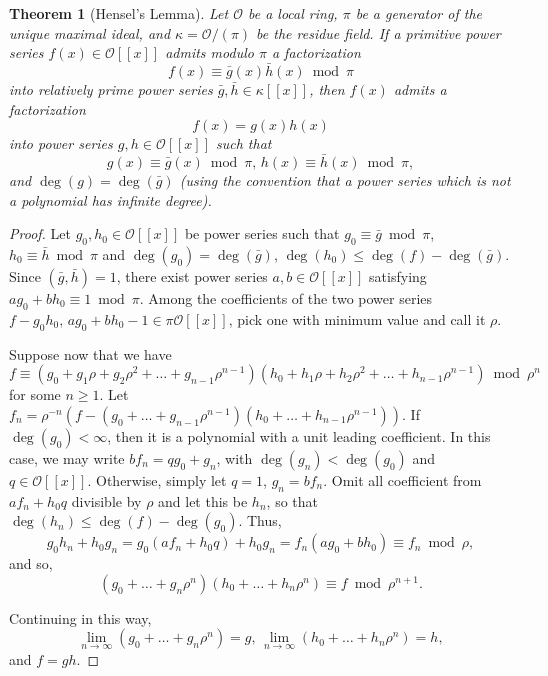 \documentclass{article}
\newtheorem{theorem}{Theorem}
\begin{document}
\begin{theorem}[Hensel's Lemma]\label{hensel}  Let $\mathcal{O}$ be a local ring, $\pi$ be a generator of the unique maximal ideal, and $\kappa = \mathcal{O}/(\pi)$ be the residue field.
If a primitive power series $f(x) \in \mathcal{O}[[x]]$ admits modulo $\pi$ a factorization
$$f(x) \equiv \bar{g}(x)\bar{h}(x) \bmod{\pi}$$
into relatively prime power series $\bar{g},\bar{h} \in \kappa[[x]]$, then $f(x)$ admits a factorization
$$f(x) = g(x)h(x)$$
into power series $g,h \in \mathcal{O}[[x]]$ such that $$g(x) \equiv \bar{g}(x) \bmod{\pi}\mbox{, } h(x) \equiv \bar{h}(x) \bmod{\pi},$$
and $\deg(g) = \deg(\bar{g})$ (using the convention that a power series which is not a polynomial has infinite degree).
\end{theorem}
\begin{proof}

Let $g_0, h_0 \in \mathcal{O}[[x]]$ be power series such that $g_0 \equiv \bar{g} \bmod \pi$, $h_0 \equiv \bar{h} \bmod \pi$ and $\deg(g_0) = \deg(\bar{g})$, $\deg(h_0) \le \deg(f) - \deg(\bar{g})$. Since $(
\bar{g}, \bar{h}) = 1$, there exist power series $a, b \in \mathcal{O}[[x]]$ satisfying $ag_0 + bh_0 \equiv 1 \bmod \pi$.  Among the coefficients of the two power series $f-g_0h_0 \mbox{, } ag_0 + bh_0 - 1 \in \pi\mathcal{O}[[x]]$, pick one with minimum value and call it $\rho$.

Suppose now that we have $$f \equiv (g_0 + g_1\rho + g_2\rho^2 + \ldots + g_{n-1}\rho^{n-1})(h_0 + h_1\rho + h_2\rho^2 + \ldots + h_{n-1}\rho^{n-1}) \bmod \rho^{n}$$ 
for some $n \ge 1$.
Let $f_n = \rho^{-n}(f - (g_0 + \ldots + g_{n-1}\rho^{n-1})(h_0 + \ldots + h_{n-1}\rho^{n-1}))$.  If $\deg(g_0) < \infty$, then it is a polynomial with a unit leading coefficient.  In this case, we may write $bf_n = qg_0 + g_n$, with $\deg(g_n) < \deg(g_0)$ and $q \in \mathcal{O}[[x]]$.  Otherwise, simply let $q = 1$, $g_n = bf_n$.  Omit all coefficient from $af_n + h_0q$ divisible by $\rho$ and let this be $h_n$, so that $\deg(h_n) \le \deg(f) - \deg(g_0)$.  Thus, $$g_0h_n + h_0g_n = g_0(af_n + h_0q) + h_0g_n = f_n(ag_0 + bh_0) \equiv f_n \bmod \rho,$$
and so,
$$(g_0 + \ldots + g_n\rho^n)(h_0 + \ldots + h_n\rho^n) \equiv f \bmod \rho^{n+1}.$$

Continuing in this way, $$\lim_{n \to \infty}(g_0 + \ldots + g_n\rho^n) = g \mbox{, } \lim_{n \to \infty}(h_0 + \ldots + h_n\rho^n) = h,$$ and $f = gh$.


\end{proof}
\end{document}
